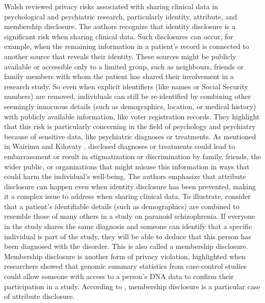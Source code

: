 \documentclass{article}
\begin{document}
Walsh \cite{2018_Walsh} reviewed privacy risks associated with sharing clinical data in psychological and psychiatric research, particularly identity, attribute, and membership disclosure. The authors recognize that identity disclosure is a significant risk when sharing clinical data. Such disclosures can occur, for example, when the remaining information in a patient's record is connected to another source that reveals their identity. These sources might be publicly available or accessible only to a limited group, such as neighbours, friends or family members with whom the patient has shared their involvement in a research study. So even when explicit identifiers (like names or Social Security numbers) are removed, individuals can still be re-identified by combining other seemingly innocuous details (such as demographics, location, or medical history) with publicly available information, like voter registration records.
They highlight that this risk is particularly concerning in the field of psychology and psychiatry because of sensitive data, like psychiatric diagnoses or treatments. 
As mentioned in Wairimu \cite{2022_Wairimu} and Kilovaty \cite{2021_Kilovaty}, disclosed diagnoses or treatments could lead to embarrassment or result in stigmatization or discrimination by family, friends, the wider public, or organizations that might misuse this information in ways that could harm the individual’s well-being.
The authors emphasize that attribute disclosure can happen even when identity disclosure has been prevented, making it a complex issue to address when sharing clinical data. To illustrate, consider that a patient's identifiable details (such as demographics) are combined to resemble those of many others in a study on paranoid schizophrenia. If everyone in the study shares the same diagnosis and someone can identify that a specific individual is part of the study, they will be able to deduce that this person has been diagnosed with the disorder. This is also called a membership disclosure.
Membership disclosure is another form of privacy violation, highlighted when researchers showed that genomic summary statistics from case-control studies could allow someone with access to a person's DNA data to confirm their participation in a study. According to \cite{2017_Templ}, membership disclosure is a particular case of attribute disclosure.
\end{document}
